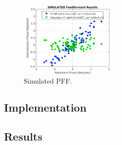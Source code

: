 
\begin{figure}
  \centering
  \includegraphics[width=0.45\textwidth]{Figures/BestFF_Simulated}
  \caption{Simulated PFF.}
  \label{f:BestFF_Simulated}
\end{figure}




\subsection{Implementation}
\label{ss:slowCorrMethod}

\subsection{Results}
\label{ss:slowCorrResults}




